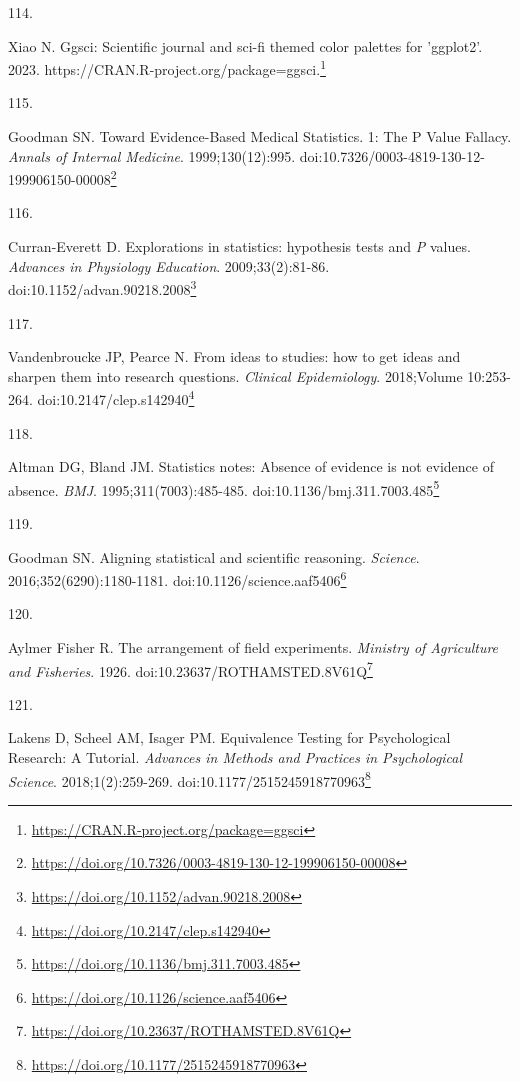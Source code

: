 \documentclass[
  a4paper,
]{book}
\newlength{\cslhangindent}
\newlength{\csllabelwidth}
\newlength{\cslentryspacingunit} %
\newenvironment{CSLReferences}[2] %
 {%
  \setlength{\parindent}{0pt}
  \ifodd #1
  \let\oldpar\par
  \def\par{\hangindent=\cslhangindent\oldpar}
  \fi
  \setlength{\parskip}{#2\cslentryspacingunit}
 }%
 {}
\newcommand{\CSLLeftMargin}[1]{\parbox[t]{\csllabelwidth}{#1}}
\newcommand{\CSLRightInline}[1]{\parbox[t]{\linewidth - \csllabelwidth}{#1}\break}
\renewcommand{\href}[2]{#2\footnote{\url{#1}}}
\begin{document}
\begin{CSLReferences}{0}{0}
\leavevmode{}%
\CSLLeftMargin{114. }%
\CSLRightInline{Xiao N. Ggsci: Scientific journal and sci-fi themed color palettes for 'ggplot2'. 2023. \href{https://CRAN.R-project.org/package=ggsci}{https://CRAN.R-project.org/package=ggsci.}}

\leavevmode{}%
\CSLLeftMargin{115. }%
\CSLRightInline{Goodman SN. Toward Evidence-Based Medical Statistics. 1: The P Value Fallacy. \emph{Annals of Internal Medicine}. 1999;130(12):995. doi:\href{https://doi.org/10.7326/0003-4819-130-12-199906150-00008}{10.7326/0003-4819-130-12-199906150-00008}}

\leavevmode{}%
\CSLLeftMargin{116. }%
\CSLRightInline{Curran-Everett D. Explorations in statistics: hypothesis tests and {\emph{P}} values. \emph{Advances in Physiology Education}. 2009;33(2):81-86. doi:\href{https://doi.org/10.1152/advan.90218.2008}{10.1152/advan.90218.2008}}

\leavevmode{}%
\CSLLeftMargin{117. }%
\CSLRightInline{Vandenbroucke JP, Pearce N. From ideas to studies: how to get ideas and sharpen them into research questions. \emph{Clinical Epidemiology}. 2018;Volume 10:253-264. doi:\href{https://doi.org/10.2147/clep.s142940}{10.2147/clep.s142940}}

\leavevmode{}%
\CSLLeftMargin{118. }%
\CSLRightInline{Altman DG, Bland JM. Statistics notes: Absence of evidence is not evidence of absence. \emph{BMJ}. 1995;311(7003):485-485. doi:\href{https://doi.org/10.1136/bmj.311.7003.485}{10.1136/bmj.311.7003.485}}

\leavevmode{}%
\CSLLeftMargin{119. }%
\CSLRightInline{Goodman SN. Aligning statistical and scientific reasoning. \emph{Science}. 2016;352(6290):1180-1181. doi:\href{https://doi.org/10.1126/science.aaf5406}{10.1126/science.aaf5406}}

\leavevmode{}%
\CSLLeftMargin{120. }%
\CSLRightInline{Aylmer Fisher R. The arrangement of field experiments. \emph{Ministry of Agriculture and Fisheries}. 1926. doi:\href{https://doi.org/10.23637/ROTHAMSTED.8V61Q}{10.23637/ROTHAMSTED.8V61Q}}

\leavevmode{}%
\CSLLeftMargin{121. }%
\CSLRightInline{Lakens D, Scheel AM, Isager PM. Equivalence Testing for Psychological Research: A Tutorial. \emph{Advances in Methods and Practices in Psychological Science}. 2018;1(2):259-269. doi:\href{https://doi.org/10.1177/2515245918770963}{10.1177/2515245918770963}}


\end{CSLReferences}
\end{document}
